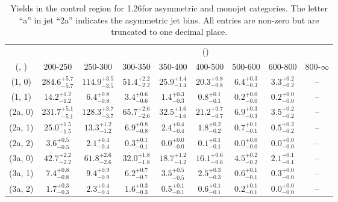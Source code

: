 \begin{table}[h!]
\tiny
\centering
\caption{Yields in the \mmj control region for 1.26\ifb for asymmetric and monojet categories. The letter ``a'' in jet \eg ``2a''  indicates the asymmetric jet bins. All entries are non-zero but are truncated to one decimal place.\label{tab:yieldssep_mumu_ewk_asym}}
\begin{tabular}
{ccccccccc}
	\hline\hline
&	& \multicolumn{8}{c}{\scalht (\gev)} \\ 
	 (\njet,  \nb) & 200-250 & 250-300 & 300-350 & 350-400 & 400-500 & 500-600 & 600-800 & 800-$\infty$ \\ [0.8ex] 
\hline
	(1, 0) & $284.6^{+ 5.7 }_{- 5.7 }$ & $114.9^{+ 3.5 }_{- 3.5 }$ & $51.4^{+ 2.2 }_{- 2.2 }$ & $25.9^{+ 1.4 }_{- 1.4 }$ & $20.3^{+ 0.8 }_{- 0.8 }$ & $6.4^{+ 0.3 }_{- 0.3 }$ & $3.3^{+ 0.2 }_{- 0.2 }$ & -- \\[0.5ex] 
	(1, 1) & $14.2^{+ 1.2 }_{- 1.2 }$ & $6.4^{+ 0.8 }_{- 0.8 }$ & $3.4^{+ 0.6 }_{- 0.6 }$ & $1.4^{+ 0.3 }_{- 0.3 }$ & $0.8^{+ 0.1 }_{- 0.1 }$ & $0.2^{+ 0.0 }_{- 0.0 }$ & $0.2^{+ 0.0 }_{- 0.0 }$ & -- \\[0.5ex] 
	(2a, 0) & $231.7^{+ 5.1 }_{- 5.1 }$ & $128.3^{+ 3.7 }_{- 3.7 }$ & $65.7^{+ 2.6 }_{- 2.6 }$ & $32.5^{+ 1.6 }_{- 1.6 }$ & $21.2^{+ 0.7 }_{- 0.7 }$ & $6.9^{+ 0.3 }_{- 0.3 }$ & $3.5^{+ 0.2 }_{- 0.2 }$ & -- \\[0.5ex] 
	(2a, 1) & $25.0^{+ 1.5 }_{- 1.5 }$ & $13.3^{+ 1.2 }_{- 1.2 }$ & $6.9^{+ 0.8 }_{- 0.8 }$ & $2.4^{+ 0.4 }_{- 0.4 }$ & $1.8^{+ 0.2 }_{- 0.2 }$ & $0.7^{+ 0.1 }_{- 0.1 }$ & $0.5^{+ 0.2 }_{- 0.2 }$ & -- \\[0.5ex] 
	(2a, 2) & $3.6^{+ 0.5 }_{- 0.5 }$ & $2.1^{+ 0.4 }_{- 0.4 }$ & $0.3^{+ 0.1 }_{- 0.1 }$ & $0.0^{+ 0.0 }_{- 0.0 }$ & $0.1^{+ 0.1 }_{- 0.1 }$ & $0.0^{+ 0.0 }_{- 0.0 }$ & $0.0^{+ 0.0 }_{- 0.0 }$ & -- \\[0.5ex] 
	(3a, 0) & $42.7^{+ 2.2 }_{- 2.2 }$ & $61.8^{+ 2.6 }_{- 2.6 }$ & $32.0^{+ 1.8 }_{- 1.8 }$ & $18.7^{+ 1.2 }_{- 1.2 }$ & $16.1^{+ 0.6 }_{- 0.6 }$ & $4.5^{+ 0.2 }_{- 0.2 }$ & $2.1^{+ 0.1 }_{- 0.1 }$ & -- \\[0.5ex] 
	(3a, 1) & $7.4^{+ 0.8 }_{- 0.8 }$ & $9.4^{+ 0.9 }_{- 0.9 }$ & $6.2^{+ 0.7 }_{- 0.7 }$ & $3.5^{+ 0.5 }_{- 0.5 }$ & $2.5^{+ 0.3 }_{- 0.3 }$ & $0.6^{+ 0.1 }_{- 0.1 }$ & $0.3^{+ 0.0 }_{- 0.0 }$ & -- \\[0.5ex] 
	(3a, 2) & $1.7^{+ 0.3 }_{- 0.3 }$ & $2.3^{+ 0.4 }_{- 0.4 }$ & $1.6^{+ 0.3 }_{- 0.3 }$ & $0.5^{+ 0.1 }_{- 0.1 }$ & $0.6^{+ 0.1 }_{- 0.1 }$ & $0.2^{+ 0.1 }_{- 0.1 }$ & $0.0^{+ 0.0 }_{- 0.0 }$ & -- \\[0.5ex] 

\end{tabular}
\end{table}
